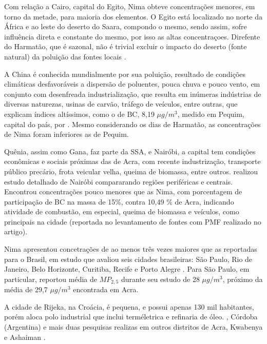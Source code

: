 Com relação a Cairo, capital do Egito, Nima obteve concentrações menores, 
em torno da metade, para maioria dos elementos. O Egito está localizado 
no norte da África e ao leste do deserto do Saara, compondo o mesmo, sendo assim,
sofre influência direta e constante do mesmo, por isso as altas concentraçoes. 
Direfente do Harmatão, que é sazonal, não é trivial excluir o impacto 
do deserto (fonte natural) da poluição das fontes locais \citet{boman2013}.

A China é conhecida mundialmente por sua poluição, resultado de condições
climáticas desfavoráveis a dispersão de poluentes, pouca chuva e pouco vento, 
em conjunto com desenfreada industrialização, que resulta em inúmeras indústrias
de diversas naturezas, usinas de carvão, tráfego de veículos, entre outras, 
que explicam índices altíssimos, como o de BC, 8,19 $\mu g/m^3$, 
medido em Pequim, capital do país, por \citet{yang2011}. Mesmo considerando 
os dias de Harmatão, as concentrações de Nima foram inferiores as de Pequim.

Quênia, assim como Gana, faz parte da SSA, e Nairóbi, a capital tem condições
econômicas e sociais próximas das de Acra, com recente industrização, transporte
público precário, frota veicular velha, queima de biomassa, entre outros.  
\citet{gaita2014} realizou estudo detalhado de Nairóbi compararando regiões 
periféricas e centrais. Encontrou concentrações pouco menores que as Nima, 
com porcentagem de participação de BC na massa de 15\%, contra 10,49 \% de Acra,
indicando atividade de combustão, em especial, queima de biomassa e veículos, 
como principais na cidade (reportada no levantamento de fontes com PMF realizado
no artigo). 

Nima apresentou concetrações de ao menos três vezes maiores que as reportadas 
para o Brasil, em estudo que avaliou seis cidades brasileiras: São Paulo, 
Rio de Janeiro, Belo Horizonte, Curitiba, Recife e Porto Alegre
\citep{andrade2012urban}. Para São Paulo, em particular, \citet{andrade2012}
reportou média de $MP_{2,5}$ durante seu estudo de 28 $\mu g / m^3$, 
próximo da média de 29,7 $\mu g / m^3$ encontrada em Acra. 

A cidade de Rijeka, na Croácia, é pequena, e possui apenas 130 mil habitantes, 
porém aloca polo industrial que inclui terméletrica e refinaria de óleo. 
 \citep{ivovsevic2015}, 
Córdoba (Argentina) \citep{achad2014} e mais duas pesquisas realizas em 
outros distritos de Acra, Kwabenya \citep{aboh2009} e Ashaiman \citep{ofosu2012}.   



